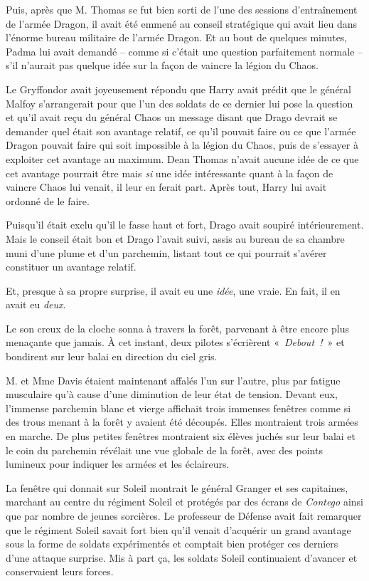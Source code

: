 Puis, après que M. Thomas se fut bien sorti de l'une des sessions d'entraînement de l'armée Dragon, il avait été emmené au conseil stratégique qui avait lieu dans l'énorme bureau militaire de l'armée Dragon. Et au bout de quelques minutes, Padma lui avait demandé -- comme si c'était une question parfaitement normale -- s'il n'aurait pas quelque idée sur la façon de vaincre la légion du Chaos.

Le Gryffondor avait joyeusement répondu que Harry avait prédit que le général Malfoy s'arrangerait pour que l'un des soldats de ce dernier lui pose la question et qu'il avait reçu du général Chaos un message disant que Drago devrait se demander quel était son avantage relatif, ce qu'il pouvait faire ou ce que l'armée Dragon pouvait faire qui soit impossible à la légion du Chaos, puis de s'essayer à exploiter cet avantage au maximum. Dean Thomas n'avait aucune idée de ce que cet avantage pourrait être mais \emph{si} une idée intéressante quant à la façon de vaincre Chaos lui venait, il leur en ferait part. Après tout, Harry lui avait ordonné de le faire.

Puisqu'il était exclu qu'il le fasse haut et fort, Drago avait soupiré intérieurement. Mais le conseil était bon et Drago l'avait suivi, assis au bureau de sa chambre muni d'une plume et d'un parchemin, listant tout ce qui pourrait s'avérer constituer un avantage relatif.

Et, presque à sa propre surprise, il avait eu une \emph{idée}, une vraie. En fait, il en avait eu \emph{deux}.

Le son creux de la cloche sonna à travers la forêt, parvenant à être encore plus menaçante que jamais. À cet instant, deux pilotes s'écrièrent «~\emph{Debout~!}~» et bondirent sur leur balai en direction du ciel gris.

\later

M. et Mme Davis étaient maintenant affalés l'un sur l'autre, plus par fatigue musculaire qu'à cause d'une diminution de leur état de tension. Devant eux, l'immense parchemin blanc et vierge affichait trois immenses fenêtres comme si des trous menant à la forêt y avaient été découpés. Elles montraient trois armées en marche. De plus petites fenêtres montraient six élèves juchés sur leur balai et le coin du parchemin révélait une vue globale de la forêt, avec des points lumineux pour indiquer les armées et les éclaireurs.

La fenêtre qui donnait sur Soleil montrait le général Granger et ses capitaines, marchant au centre du régiment Soleil et protégés par des écrans de \emph{Contego} ainsi que par nombre de jeunes sorcières. Le professeur de Défense avait fait remarquer que le régiment Soleil savait fort bien qu'il venait d'acquérir un grand avantage sous la forme de soldats expérimentés et comptait bien protéger ces derniers d'une attaque surprise. Mis à part ça, les soldats Soleil continuaient d'avancer et conservaient leurs forces.

